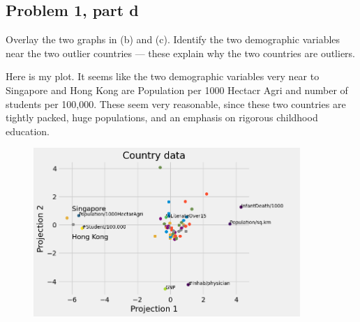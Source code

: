 \subsection{Problem 1, part d}
Overlay the two graphs in (b) and (c). Identify the two demographic variables near the two outlier countries — these explain why the two countries are outliers.
\partbreak
\begin{solution}

    Here is my plot. It seems like the two demographic variables very near to Singapore and Hong Kong are Population per 1000 Hectacr Agri and number of students per 100,000. These seem very reasonable, since these two countries are tightly packed, huge populations, and an emphasis on rigorous childhood education.

    \begin{figure}[h]
        \centering
        \includegraphics[width = 0.9\textwidth]{Images/biplot.png}
        \label{fig:p1c}
    \end{figure}
\end{solution}

\newpage
